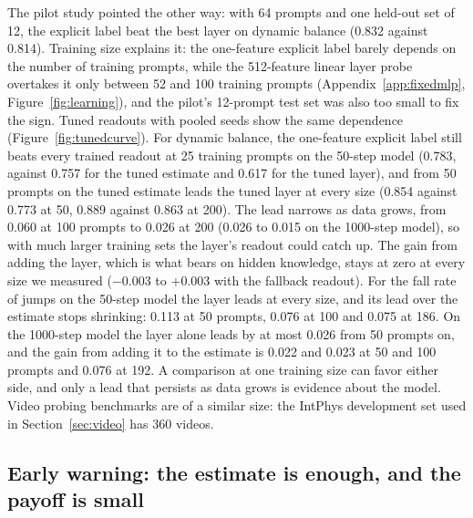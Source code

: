 The pilot study pointed the other way: with 64 prompts and one held-out set of 12, the explicit label beat the best layer on dynamic balance (0.832 against 0.814). Training size explains it: the one-feature explicit label barely depends on the number of training prompts, while the 512-feature linear layer probe overtakes it only between 52 and 100 training prompts (Appendix~\ref{app:fixedmlp}, Figure~\ref{fig:learning}), and the pilot's 12-prompt test set was also too small to fix the sign. Tuned readouts with pooled seeds show the same dependence (Figure~\ref{fig:tunedcurve}). For dynamic balance, the one-feature explicit label still beats every trained readout at 25 training prompts on the 50-step model (0.783, against 0.757 for the tuned estimate and 0.617 for the tuned layer), and from 50 prompts on the tuned estimate leads the tuned layer at every size (0.854 against 0.773 at 50, 0.889 against 0.863 at 200). The lead narrows as data grows, from 0.060 at 100 prompts to 0.026 at 200 (0.026 to 0.015 on the 1000-step model), so with much larger training sets the layer's readout could catch up. The gain from adding the layer, which is what bears on hidden knowledge, stays at zero at every size we measured ($-0.003$ to $+0.003$ with the fallback readout). For the fall rate of jumps on the 50-step model the layer leads at every size, and its lead over the estimate stops shrinking: 0.113 at 50 prompts, 0.076 at 100 and 0.075 at 186. On the 1000-step model the layer alone leads by at most 0.026 from 50 prompts on, and the gain from adding it to the estimate is 0.022 and 0.023 at 50 and 100 prompts and 0.076 at 192. A comparison at one training size can favor either side, and only a lead that persists as data grows is evidence about the model. Video probing benchmarks are of a similar size: the IntPhys development set used in Section~\ref{sec:video} has 360 videos.

\subsection{Early warning: the estimate is enough, and the payoff is small}
\label{sec:early}

\begin{table}[t]
\centering
\begin{minipage}[t]{0.37\linewidth}
\centering
\caption{The training-free rule ``abort if the decoded estimate shows any floating''. Precision: flagged samples that do float. Recall: floating samples flagged.}
\label{tab:detector}
\resizebox{\linewidth}{!}{}
\end{minipage}\hfill
\begin{minipage}[t]{0.6\linewidth}
\centering
\caption{Compute saved by aborting at 20\% of denoising, with the final check kept, against finish-then-filter at the same delivered failure (its budget of 2, 3 or 5 tries). The trained readouts (ridge on frame-averaged inputs: everything the estimate shows, one layer, or both) abort the same share of samples as the rule.}
\label{tab:savings}
\resizebox{\linewidth}{!}{}
\end{minipage}
\end{table}

